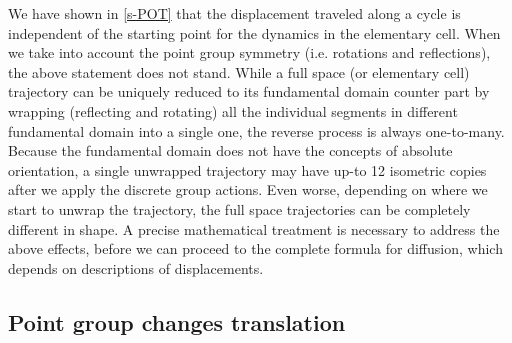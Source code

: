 We have shown in \ref{s-POT} that the displacement traveled along a
cycle is independent of the starting point for the
dynamics in the elementary cell. When we take into account
the point group symmetry (i.e. rotations and reflections), the above
statement does  not stand. While a full space (or elementary cell)
trajectory can be uniquely reduced to its fundamental domain counter
part by wrapping (reflecting and rotating) all the individual segments
in different fundamental domain into a single one, the reverse process
is always one-to-many. Because the fundamental domain does not have the
concepts of absolute orientation, a single unwrapped trajectory may
have up-to 12 isometric copies after we apply the discrete group
actions. Even worse, depending on where we start to unwrap the
trajectory, the full space trajectories can be completely different in
shape. A precise mathematical treatment is necessary to address the
above effects, before we can proceed to the complete formula for
diffusion, which depends on descriptions of displacements.




\subsection{Point group changes translation \label{s-FundTranslation}}

